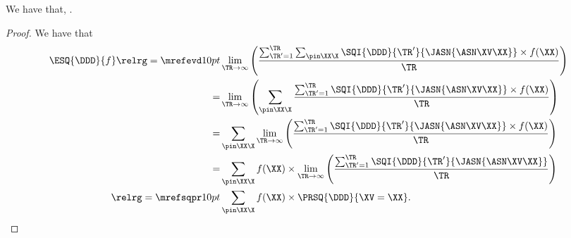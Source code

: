 \begin{proposition}
  We have that, \evsqexprprop.%
\end{proposition}

\begin{proof}
  We have that
  \begin{align*}
    \ESQ{\DDD}{f} \relrg = {\mrefevd} 10pt &
    \lim_{\TR \rightarrow \infty}\left(\frac{\sum_{\TR' = 1}^{\TR}\sum_{\pin\XX\X}\SQI{\DDD}{\TR'}{\JASN{\ASN\XV\XX}}\times f(\XX)}{\TR}\right)\\
          = & \lim_{\TR \rightarrow \infty}\left(\sum_{\pin\XX\X}\frac{\sum_{\TR' = 1}^{\TR}\SQI{\DDD}{\TR'}{\JASN{\ASN\XV\XX}}\times f(\XX)}{\TR}\right)\\
          = & \sum_{\pin\XX\X}\lim_{\TR \rightarrow \infty}\left(\frac{\sum_{\TR' = 1}^{\TR}\SQI{\DDD}{\TR'}{\JASN{\ASN\XV\XX}}\times f(\XX)}{\TR}\right)\\
          = & \sum_{\pin\XX\X}f(\XX) \times \lim_{\TR \rightarrow \infty}\left(\frac{\sum_{\TR' = 1}^{\TR}\SQI{\DDD}{\TR'}{\JASN{\ASN\XV\XX}}}{\TR}\right)\\
      \relrg = {\mrefsqpr} 10pt & \sum_{\pin\XX\X}f(\XX) \times \PRSQ{\DDD}{\XV = \XX}.
  \end{align*}
\end{proof}
